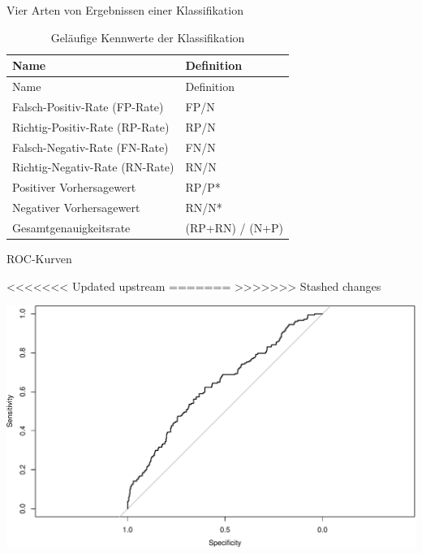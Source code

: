 \begin{frame}{Vier Arten von Ergebnissen einer Klassifikation}

\begin{longtable}[]{@{}ll@{}}
\caption{Geläufige Kennwerte der Klassifikation}\tabularnewline
\toprule
Name & Definition\tabularnewline
\midrule
\endfirsthead
\toprule
Name & Definition\tabularnewline
\midrule
\endhead
Falsch-Positiv-Rate (FP-Rate) & FP/N\tabularnewline
Richtig-Positiv-Rate (RP-Rate) & RP/N\tabularnewline
Falsch-Negativ-Rate (FN-Rate) & FN/N\tabularnewline
Richtig-Negativ-Rate (RN-Rate) & RN/N\tabularnewline
Positiver Vorhersagewert & RP/P*\tabularnewline
Negativer Vorhersagewert & RN/N*\tabularnewline
Gesamtgenauigkeitsrate & (RP+RN) / (N+P)\tabularnewline
\bottomrule
\end{longtable}

\end{frame}

\begin{frame}[fragile]{ROC-Kurven}

\begin{Shaded}
\begin{Highlighting}[]
<<<<<<< Updated upstream
\StringTok{ }\OperatorTok{$}\OperatorTok{$}
=======
\StringTok{ }
>>>>>>> Stashed changes
\end{Highlighting}
\end{Shaded}

\begin{center}\includegraphics[width=0.8\linewidth]{PraDa_Folien_nm_2_files/figure-beamer/unnamed-chunk-22-1} \end{center}

\end{frame}

